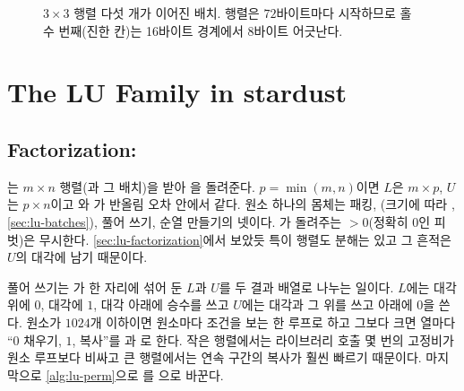 \begin{figure}[htbp]
\centering
{}
\caption{$3\times3$  행렬 다섯 개가 이어진 배치. 행렬은 $72$바이트마다 시작하므로 홀수 번째(진한 칸)는 16바이트 경계에서 8바이트 어긋난다.}
\label{fig:lu-align}
\end{figure}

\section{The LU Family in stardust}
\label{sec:lu-stardust-family}

\subsection{Factorization: \texorpdfstring{}{lu}}

는 $m\times n$ 행렬(과 그 배치)을 받아 을 돌려준다. $p=\min(m,n)$이면 $L$은 $m\times p$, $U$는 $p\times n$이고 와 가 반올림 오차 안에서 같다. 원소 하나의 몸체는 패킹, (크기에 따라 , \cref{sec:lu-batches}), 풀어 쓰기, 순열 만들기의 넷이다. 가 돌려주는 $>0$(정확히 $0$인 피벗)은 무시한다. \cref{sec:lu-factorization}에서 보았듯 특이 행렬도 분해는 있고 그 흔적은 $U$의 대각에 남기 때문이다.

풀어 쓰기는 가 한 자리에 섞어 둔 $L$과 $U$를 두 결과 배열로 나누는 일이다. $L$에는 대각 위에 $0$, 대각에 $1$, 대각 아래에 승수를 쓰고 $U$에는 대각과 그 위를 쓰고 아래에 $0$을 쓴다. 원소가 $1024$개 이하이면 원소마다 조건을 보는 한 루프로 하고 그보다 크면 열마다 ``$0$ 채우기, $1$, 복사''를 과 로 한다. 작은 행렬에서는 라이브러리 호출 몇 번의 고정비가 원소 루프보다 비싸고 큰 행렬에서는 연속 구간의 복사가 훨씬 빠르기 때문이다. 마지막으로 \cref{alg:lu-perm}으로 를 으로 바꾼다.

